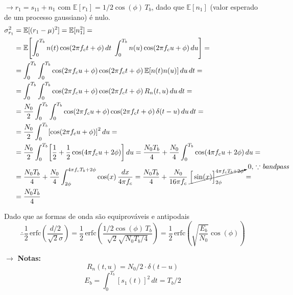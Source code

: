 \vspace{0.75em}
\noindent $\rightarrow r_1 = s_{11} + n_1$ com $\mathbb{E}[r_1] = 1/2 \cos(\phi)\, T_b$, dado que $\mathbb{E}[n_1]$ (valor esperado de um processo gaussiano) é nulo.
\begin{align*}
    \sigma^2_{r_1} &= \mathbb{E}[(r_1 - \mu)^2] = \mathbb{E}[n_1^2] = \\
    &= \mathbb{E}\left[ \int_{0}^{T_b} n(t) \cos(2\pi f_c t + \phi) \, dt\; \int_{0}^{T_b} n(u) \cos(2\pi f_c u + \phi) \, du \right] = \\
    &= \int_{0}^{T_b} \int_{0}^{T_b} \cos(2\pi f_c u + \phi) \cos(2\pi f_c t + \phi)\, \mathbb{E}[n(t) n(u)] \, du\, dt = \\
    &= \int_{0}^{T_b} \int_{0}^{T_b} \cos(2\pi f_c u + \phi) \cos(2\pi f_c t + \phi)\, R_n(t,u)\, du\, dt = \\
    &= \frac{N_0}{2} \int_{0}^{T_b} \int_{0}^{T_b} \cos(2\pi f_c u + \phi) \cos(2\pi f_c t + \phi)\, \delta(t-u)\, du\, dt = \\
    &= \frac{N_0}{2} \int_{0}^{T_b} \left[\cos(2\pi f_c u + \phi)\right]^2\, du = \\
    &= \frac{N_0}{2} \int_{0}^{T_b} \left[ \frac{1}{2} + \frac{1}{2}\cos(4\pi f_c u + 2\phi) \right]\, du = \frac{N_0 T_b}{4} + \frac{N_0}{4}\int_{0}^{T_b} \cos(4\pi f_c u + 2\phi)\, du = \\
    &= \frac{N_0 T_b}{4} + \frac{N_0}{4} \int_{2\phi}^{4\pi f_c T_b + 2\phi} \cos(x)\, \frac{dx}{4\pi f_c} = \frac{N_0 T_b}{4} + \frac{N_0}{16\pi f_c}\; \cancelto{0,\, \because \textit{bandpass}}{\Bigr[\sin(x)\Bigr]_{2\phi}^{4\pi f_c T_b + 2\phi}} = \\
    &= \frac{N_0 T_b}{4}
\end{align*}

\vspace{0.75em}
\noindent Dado que as formas de onda são equiprováveis e antipodais
$$
    \therefore \frac{1}{2}\, \text{erfc}\left(\frac{d/2}{\sqrt{2}\sigma}\right) = \frac{1}{2}\, \text{erfc}\left(\frac{1/2 \cos(\phi)\, T_b}{\sqrt{2}\sqrt{N_0 T_b/4}}\right) = \frac{1}{2} \, \text{erfc}\left( \sqrt{\frac{E_b}{N_0}} \cos(\phi) \right)
$$

\vspace{0.75em}
\noindent $\pmb{\rightarrow}$ \textbf{Notas:} 
$$R_n(t,u) = N_0/2 \cdot \delta(t-u)$$
$$E_b = \int_{0}^{T_b} [s_1(t)]^2\, dt = T_b/2$$